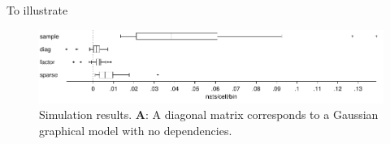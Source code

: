 To illustrate 

\begin{figure}
\centering
\includegraphics[width=1.0\textwidth]{figures/Figure3.pdf}
\caption{
Simulation results.
\textbf{A}: A diagonal matrix corresponds to a Gaussian graphical model with no dependencies. 
}\label{fig:03}
\end{figure}


